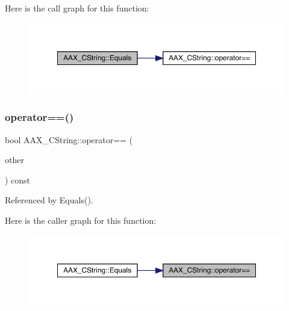 Here is the call graph for this function\+:
\nopagebreak
\begin{figure}[H]
\begin{center}
\leavevmode
\includegraphics[width=350pt]{a01573_af54d7f7faeab6cf63efb9239109d3390_cgraph}
\end{center}
\end{figure}
\mbox{\label{a01573_a6946cf59b5c5794234b2ea4a47b60b84}} 
\subsubsection{\texorpdfstring{operator==()}{operator==()}\hspace{0.1cm}{\footnotesize\ttfamily [1/3]}}
{\footnotesize\ttfamily bool A\+A\+X\+\_\+\+C\+String\+::operator== (\begin{DoxyParamCaption}\item[{const \mbox{\hyperlink{a01573}{A\+A\+X\+\_\+\+C\+String}} \&}]{other }\end{DoxyParamCaption}) const}



Referenced by Equals().

Here is the caller graph for this function\+:
\nopagebreak
\begin{figure}[H]
\begin{center}
\leavevmode
\includegraphics[width=350pt]{a01573_a6946cf59b5c5794234b2ea4a47b60b84_icgraph}
\end{center}
\end{figure}
\mbox{\label{a01573_a76af1f25acabbe78a0cf56fe31c46edb}} 
